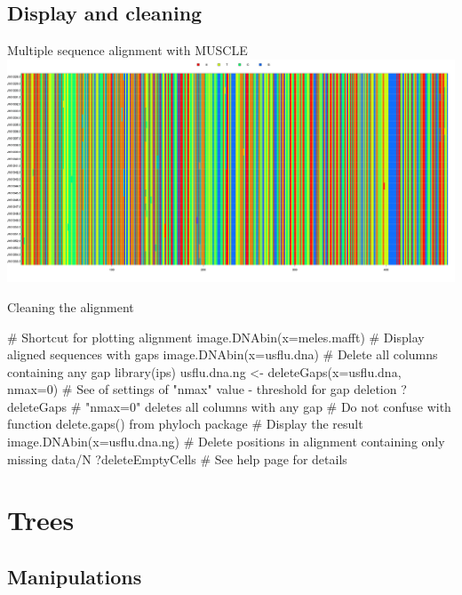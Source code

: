 \documentclass[compress, ucs, xelatex, 11pt, xcolor=svgnames,
  hyperref={
    bookmarks=true,
    unicode=true,
    colorlinks=true,
    pdftitle={Molecular data in R},
    plainpages=false,
    pdfauthor={Vojtech Zeisek},
    pdfsubject={Course about phylogeny and evolution in R},
    pdfcreator={XeLaTeX},
    pdfkeywords={R, evolution, phylogeny, molecular data},
    linkcolor=Tomato,
    anchorcolor=SaddleBrown,
    citecolor=Goldenrod,
    filecolor=DarkMagenta,
    menucolor=Sienna,
    urlcolor=DarkTurquoise,
    pdftex},
  url={hyphens, lowtilde} %
  ]{beamer}
\begin{document}
\subsection{Display and cleaning}

\begin{frame}{Multiple sequence alignment with MUSCLE}
  \includegraphics[width=\textwidth]{muscle.png}
\end{frame}

\begin{frame}[fragile]{Cleaning the alignment}
  \begin{spluscode}
    # Shortcut for plotting alignment
    image.DNAbin(x=meles.mafft)
    # Display aligned sequences with gaps
    image.DNAbin(x=usflu.dna)
    # Delete all columns containing any gap
    library(ips)
    usflu.dna.ng <- deleteGaps(x=usflu.dna, nmax=0)
    # See of settings of "nmax" value - threshold for gap deletion
    ?deleteGaps # "nmax=0" deletes all columns with any gap
    # Do not confuse with function delete.gaps() from phyloch package
    # Display the result
    image.DNAbin(x=usflu.dna.ng)
    # Delete positions in alignment containing only missing data/N
    ?deleteEmptyCells # See help page for details
  \end{spluscode}
\end{frame}

\section{Trees}

\subsection{Manipulations}
\end{document}
